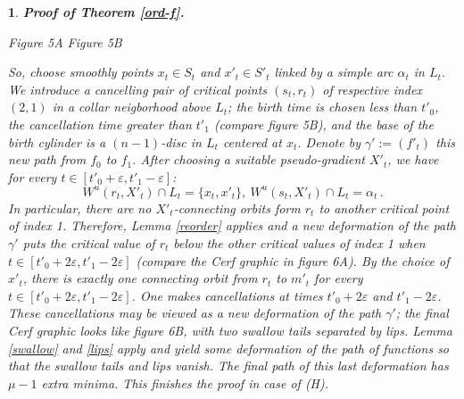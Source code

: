 \documentclass[12pt]{amsart}
\newtheorem{rien}[thm]{}
\def\ga{\gamma}
\def\al{\alpha}
\def\ep{\varepsilon}
\begin{document}
\begin{rien}{\bf Proof of Theorem \ref{ord-f}.}
{\begin{center}
{ \vspace{0cm}
\centerline{\rm Figure 5A\hskip 3cm Figure 5B}
}
\end{center}

 
 So, choose smoothly %
 points $x_t\in S_t$ 
 and $x'_t\in S'_t$ linked by a simple arc $\al_t$ in 
 $L_t$. We introduce a cancelling pair of critical points $(s_t,r_t) $ of respective index $(2, 1)$
  in a collar neigborhood
 above
 $L_t$; the birth time is  chosen less than $t'_0$,  the cancellation time greater than $t'_1$ (compare
 figure  5B),  and the base of the birth cylinder is a $(n-1)$-disc in $L_t$ centered at $x_t$.
   Denote by $\ga' :=\left(f'_t\right)$ this new path from $f_0$ to $f_1$.
 After choosing a suitable pseudo-gradient $X'_t$, we have for every $t\in [t'_0+\ep,t'_1-\ep]$:
 $$W^u(r_t,X'_t) \cap L_t= \{x_t,x'_t\}, \  W^u(s_t, X'_t)\cap L_t=\al_t\,.
 $$
 In particular, there are no $X'_t$-connecting orbits form $r_t$ to another   critical point of index 1. Therefore, Lemma \ref{reorder} applies and a new deformation
 of the path $\ga'$ puts the critical value of $r_t $ below the other critical values of index 1
 when $t\in [t'_0+2\ep,t'_1-2\ep]$
 (compare  the Cerf graphic in figure 6A).
 By the choice of $x'_t$, 
 there is exactly one connecting orbit from $r_t$ to $m'_t$ for every $t\in [t'_0+2\ep,t'_1-2\ep]$. 
 One makes  
 cancellations at times $t'_0+2\ep$ and $t'_1-2\ep$.
 These cancellations may be viewed as a new deformation of the path $\gamma'$;
  the final Cerf graphic looks like figure 6B, with two swallow tails separated by lips. Lemma \ref{swallow} and \ref{lips} apply
   and yield  some deformation of the path  of functions so that 
   the swallow tails  and lips vanish. The final path of this last deformation 
   has $\mu-1$ extra minima. This finishes the proof in case of (H).
}\end{rien}
\end{document}
